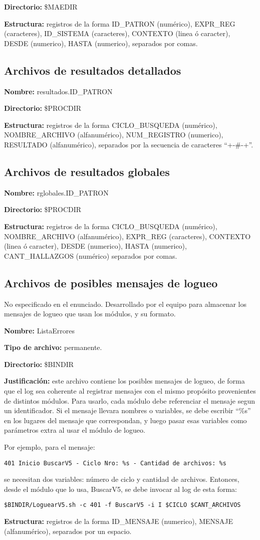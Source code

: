 \documentclass[a4paper,12pt]{article}
\begin{document}
{\bf Directorio:} \$MAEDIR

{\bf Estructura:} registros de la forma ID\_PATRON (numérico), EXPR\_REG (caracteres), ID\_SISTEMA (caracteres), CONTEXTO (linea ó caracter), DESDE (numerico), HASTA (numerico), separados por comas.

\subsection{Archivos de resultados detallados}

{\bf Nombre:} resultados.ID\_PATRON

{\bf Directorio:} \$PROCDIR

{\bf Estructura:} registros de la forma CICLO\_BUSQUEDA (numérico), NOMBRE\_ARCHIVO (alfanumérico), NUM\_REGISTRO (numerico), RESULTADO (alfanumérico), separados por la secuencia de caracteres ``+-\#-+''.

\subsection{Archivos de resultados globales}

{\bf Nombre:} rglobales.ID\_PATRON

{\bf Directorio:} \$PROCDIR

{\bf Estructura:} registros de la forma CICLO\_BUSQUEDA (numérico), NOMBRE\_ARCHIVO (alfanumérico), EXPR\_REG (caracteres), CONTEXTO (linea ó caracter), DESDE (numerico), HASTA (numerico), CANT\_HALLAZGOS (numérico) separados por comas.

\subsection{Archivos de posibles mensajes de logueo}

No especificado en el enunciado. Desarrollado por el equipo para almacenar los mensajes de logueo que usan los módulos, y su formato.

{\bf Nombre:} ListaErrores

{\bf Tipo de archivo:} permanente.

{\bf Directorio:} \$BINDIR

{\bf Justificación:} este archivo contiene los posibles mensajes de logueo, de forma que el log sea coherente al registrar mensajes con el mismo propósito provenientes de distintos módulos. Para usarlo, cada módulo debe referenciar el mensaje segun un identificador. Si el mensaje llevara nombres o variables, se debe escribir ``\%s'' en los lugares del mensaje que correspondan, y luego pasar esas variables como parámetros extra al usar el módulo de logueo.

Por ejemplo, para el mensaje:

{\tt 401 Inicio BuscarV5 - Ciclo Nro: \%s - Cantidad de archivos: \%s}

se necesitan dos variables: número de ciclo y cantidad de archivos. Entonces, desde el módulo que lo usa, BuscarV5, se debe invocar al log de esta forma:

{\tt \$BINDIR/LoguearV5.sh -c 401 -f BuscarV5 -i I \$CICLO \$CANT\_ARCHIVOS}

{\bf Estructura:} registros de la forma ID\_MENSAJE (numerico), MENSAJE (alfanumérico), separados por un espacio.
\end{document}
